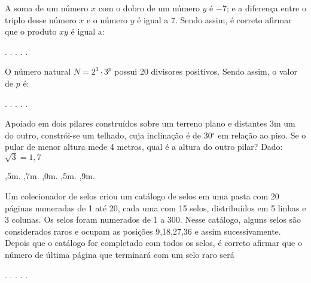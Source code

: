 \begin{question}%
A soma de um número \(x\) com o dobro de um número \(y\) é \(-7\); e a diferença entre o triplo desse número \(x\) e o número \(y\) é igual a \(7\). Sendo assim, é correto afirmar que o produto \(xy\) é igual a:
    \begin{tasks}
        .
        .
        .
        .
        .
    \end{tasks}
\end{question}

\begin{question}%
O número natural \(N= 2^3 \cdot 3^p\) possui 20 divisores positivos. Sendo assim, o valor de \(p\) é:
    \begin{tasks}
        .
        .
        .
        .
        .
    \end{tasks}
\end{question}

\begin{question}%
Apoiado em dois pilares construídos sobre um terreno plano e distantes 3m um do outro, constrói-se um telhado, cuja inclinação é de 30\(^\circ\) em relação ao piso. Se o pular de menor altura mede 4 metros, qual é a altura do outro pilar? Dado: \(\sqrt{3} = 1,7\)
    \begin{tasks}
        ,5m.
        ,7m.
        ,0m.
        ,5m.
        ,9m.
    \end{tasks}
\end{question}

\begin{question}%
Um colecionador de selos criou um catálogo de selos em uma pasta com 20 páginas numeradas de 1 até 20, cada uma com 15 selos, distribuídos em 5 linhas e 3 colunas. Os selos foram numerados de 1 a 300. Nesse catálogo, alguns selos são considerados raros e ocupam as posições 9\textordfeminine{},18\textordfeminine{},27\textordfeminine{},36\textordfeminine{} e assim sucessivamente. Depois que o catálogo for completado com todos os selos, é correto afirmar que o número de última página que terminará com um selo raro será
    \begin{tasks}
        .
        .
        .
        .
        .
    \end{tasks}
\end{question}


